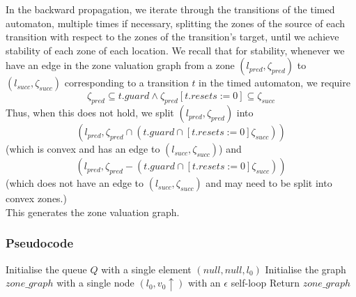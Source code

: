 \documentclass[a4paper]{llncs}
\begin{document}
In the backward propagation, we
iterate through the transitions of the timed automaton, multiple times
if necessary, splitting the zones of the source of each transition
with respect to the zones of the transition's target, until we achieve
stability of each zone of each location. We recall that for stability,
whenever we have an edge in the zone valuation graph from a zone
$(l_{pred}, \zeta _{pred})$ to $(l_{succ}, \zeta _{succ})$
corresponding to a transition $t$ in the timed automaton, we require 
\begin{displaymath} 
  \zeta _{pred} \subseteq t.guard
  \wedge
  \zeta _{pred} [t.resets := 0] \subseteq \zeta _{succ}
\end{displaymath} 
Thus, when this does not hold, we split $(l_{pred}, \zeta _{pred})$
into
\begin{displaymath} 
  (l_{pred}, \zeta _{pred} \cap (t.guard \cap [t.resets := 0] \zeta _{succ}))
\end{displaymath} 
(which is convex and has an edge to $(l_{succ}, \zeta _{succ})$)
and
\begin{displaymath} 
  (l_{pred}, \zeta _{pred} - (t.guard \cap [t.resets := 0] \zeta _{succ}))
\end{displaymath} 
(which does not have an edge to $(l_{succ}, \zeta _{succ})$ and may
need to be split into convex zones.) \\
This generates the zone valuation graph.

\subsubsection{Pseudocode}

\begin{algorithm2e}[H]
  Initialise the queue $Q$ with a single element $(null, null, l_0)$\;
  Initialise the graph $zone\_graph$ with a single node $(l_0, v_0 \uparrow)$
  with an $\epsilon$ self-loop\;
  Return $zone\_graph$\;
\end{algorithm2e}
\end{document}
